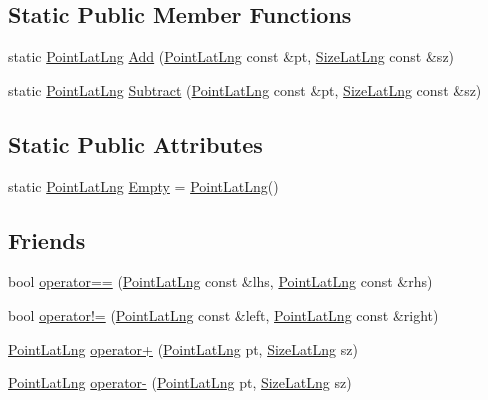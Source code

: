 \subsection*{\-Static \-Public \-Member \-Functions}
\begin{DoxyCompactItemize}
\item 
static \hyperlink{structinternals_1_1_point_lat_lng}{\-Point\-Lat\-Lng} \hyperlink{group___o_p_map_widget_ga52f0413f61d22a37409a17892acf80cd}{\-Add} (\hyperlink{structinternals_1_1_point_lat_lng}{\-Point\-Lat\-Lng} const \&pt, \hyperlink{structinternals_1_1_size_lat_lng}{\-Size\-Lat\-Lng} const \&sz)
\item 
static \hyperlink{structinternals_1_1_point_lat_lng}{\-Point\-Lat\-Lng} \hyperlink{group___o_p_map_widget_ga1666139610f408d4ec78b5afafdff3d9}{\-Subtract} (\hyperlink{structinternals_1_1_point_lat_lng}{\-Point\-Lat\-Lng} const \&pt, \hyperlink{structinternals_1_1_size_lat_lng}{\-Size\-Lat\-Lng} const \&sz)
\end{DoxyCompactItemize}
\subsection*{\-Static \-Public \-Attributes}
\begin{DoxyCompactItemize}
\item 
static \hyperlink{structinternals_1_1_point_lat_lng}{\-Point\-Lat\-Lng} \hyperlink{group___o_p_map_widget_gac62d167bf1e7f0374f7e536e64320c13}{\-Empty} = \hyperlink{structinternals_1_1_point_lat_lng}{\-Point\-Lat\-Lng}()
\end{DoxyCompactItemize}
\subsection*{\-Friends}
\begin{DoxyCompactItemize}
\item 
bool \hyperlink{group___o_p_map_widget_ga9265718a15e315e6d89a008c945393b3}{operator==} (\hyperlink{structinternals_1_1_point_lat_lng}{\-Point\-Lat\-Lng} const \&lhs, \hyperlink{structinternals_1_1_point_lat_lng}{\-Point\-Lat\-Lng} const \&rhs)
\item 
bool \hyperlink{group___o_p_map_widget_gab7da08dc85e294bae6bc1e2aed690d7f}{operator!=} (\hyperlink{structinternals_1_1_point_lat_lng}{\-Point\-Lat\-Lng} const \&left, \hyperlink{structinternals_1_1_point_lat_lng}{\-Point\-Lat\-Lng} const \&right)
\item 
\hyperlink{structinternals_1_1_point_lat_lng}{\-Point\-Lat\-Lng} \hyperlink{group___o_p_map_widget_ga488020cfd021f98e4856f128d9448367}{operator+} (\hyperlink{structinternals_1_1_point_lat_lng}{\-Point\-Lat\-Lng} pt, \hyperlink{structinternals_1_1_size_lat_lng}{\-Size\-Lat\-Lng} sz)
\item 
\hyperlink{structinternals_1_1_point_lat_lng}{\-Point\-Lat\-Lng} \hyperlink{group___o_p_map_widget_ga7af0e8545fa560e7264f0c7cedae458b}{operator-\/} (\hyperlink{structinternals_1_1_point_lat_lng}{\-Point\-Lat\-Lng} pt, \hyperlink{structinternals_1_1_size_lat_lng}{\-Size\-Lat\-Lng} sz)
\end{DoxyCompactItemize}


